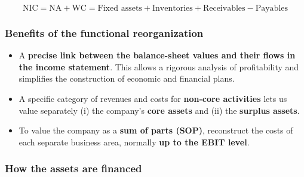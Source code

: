 \begin{center}
\end{center}

\begin{keybox}
\[
\text{NIC} = \text{NA} + \text{WC} = \text{Fixed assets} + \text{Inventories} + \text{Receivables} - \text{Payables}
\]
\end{keybox}

\subsubsection*{Benefits of the functional reorganization}
\begin{itemize}
  \item A \textbf{precise link between the balance-sheet values and their flows in the income statement}. This allows a rigorous analysis of profitability and simplifies the construction of economic and financial plans.
  \item A specific category of revenues and costs for \textbf{non-core activities} lets us value separately (i) the company's \textbf{core assets} and (ii) the \textbf{surplus assets}.
  \item To value the company as a \textbf{sum of parts (SOP)}, reconstruct the costs of each separate business area, normally \textbf{up to the EBIT level}.
\end{itemize}

\subsubsection*{How the assets are financed}

